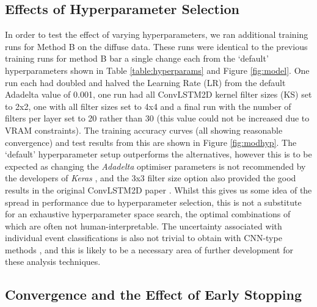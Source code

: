 \subsection{Effects of Hyperparameter Selection}
In order to test the effect of varying hyperparameters, we ran additional training runs for Method B on the diffuse data. These runs were identical to the previous training runs for method B bar a single change each from the `default' hyperparameters shown in Table \ref{table:hyperparams} and Figure \ref{fig:model}. One run each had doubled and halved the Learning Rate (LR) from the default Adadelta value of 0.001, one run had all ConvLSTM2D kernel filter sizes (KS) set to 2x2, one with all filter sizes set to 4x4 and a final run with the number of filters per layer set to 20 rather than 30 (this value could not be increased due to VRAM constraints). The training accuracy curves (all showing reasonable convergence) and test results from this are shown in Figure \ref{fig:modhyp}. The `default' hyperparameter setup outperforms the alternatives, however this is to be expected as changing the \textit{Adadelta} optimiser parameters is not recommended by the developers of \textit{Keras} \cite{Keras}, and the 3x3 filter size option also provided the good results in the original ConvLSTM2D paper \cite{shi}. Whilst this gives us some idea of the spread in performance due to hyperparameter selection, this is not a substitute for an exhaustive hyperparameter space search, the optimal combinations of which are often not human-interpretable. The uncertainty associated with individual event classifications is also not trivial to obtain with CNN-type methods \cite{mike} \cite{gal2015}, and this is likely to be a necessary area of further development for these analysis techniques.

\subsection{Convergence and the Effect of Early Stopping}

